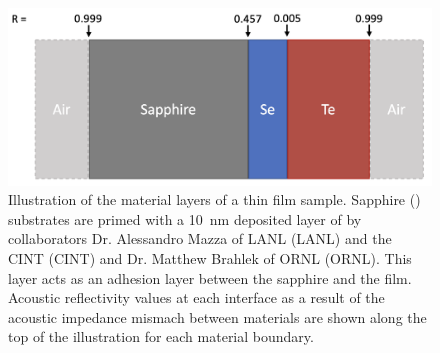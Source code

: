 \begin{table}[t]
    \caption[Material parameters for  relevant to observing Brillouin traveling-wave modes and Raman standing-wave modes.]{Material parameters for  relevant to observing Brillouin traveling-wave modes and Raman standing-wave modes, obtained from published values for bulk  as well as for  thin films. Here, \(\Gamma_{\rm B}\) is the angular Brillouin linewidth (phonon dissipation rate) and the inverse of phonon lifetime \(\tau = 2\pi\Gamma_{\rm B}^{-1}\), \(v_{\rm s,\,long}\) is the longitudinal sound speed, \(n\) is the refractive index, \(l_{\rm coh}\) is the phonon coherence length (mean travel distance), and \(P_{\rm CoBS}\) is the scattered power for the \ac{CoBS} process, reported here for \SI{500}{\nano\meter} , and scales with \(L^{2}\) (Equation~\ref{eq:Raman:ScatteredPowerPhi}). Finally, \(\Omega_{\rm B}\) is the angular Brillouin frequency shift (Equation~\ref{eq:Raman:f_B}), and \(\Omega_{\rm R,\,\SI{1}{\micro\meter}}\) is the first harmonic (\(n=1\)) of the fundamental \(L_{0}\) Raman-like mode for \(L=\) \SI{1}{\micro\meter} (Equation~\ref{eq:Raman:f_R}). While  and  are transparent at \SI{1.55}{\micro\meter},  is absorptive here. However, transmission becomes meaningful through thin films, with \SI{1}{\micro\meter} of deposited  permitting 11.4\% and \SI{500}{\nano\meter} permitting 29\% of \SI{1.55}{\micro\meter} light to transmit. \cite{ciesielski2018permittivity} This extra \(\sim\)70\% loss (for each of the three optical fields) has been accounted for in the scattered power value for the \ac{CoBS} process listed in the table.}
    \label{tab:Raman:Te}
\end{table}

\begin{figure}[t]
  \centering
  \includegraphics[width=.8\textwidth]{figs/4-Raman/AcousticImpedance.png}
  \caption[Illustration of the material layers of a  thin film sample.]{Illustration of the material layers of a  thin film sample. Sapphire () substrates are primed with a \SI{10}{\nano\meter} deposited layer of  by collaborators Dr. Alessandro Mazza of \acl{LANL} (\ac{LANL}) and the \acl{CINT} (\ac{CINT}) and Dr. Matthew Brahlek of \acl{ORNL} (\ac{ORNL}). This  layer acts as an adhesion layer between the sapphire and the  film. Acoustic reflectivity values at each interface as a result of the acoustic impedance mismach between materials are shown along the top of the illustration for each material boundary.}
  \label{fig:Raman:AcousticImpedance}
\end{figure}


